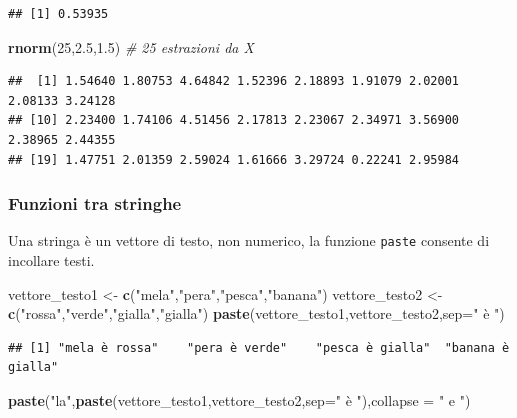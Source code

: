 \documentclass[
  11pt,
]{book}
\newenvironment{Shaded}{\begin{snugshade}}{\end{snugshade}}
\newcommand{\AttributeTok}[1]{\textcolor[rgb]{0.13,0.29,0.53}{#1}}
\newcommand{\CommentTok}[1]{\textcolor[rgb]{0.56,0.35,0.01}{\textit{#1}}}
\newcommand{\DecValTok}[1]{\textcolor[rgb]{0.00,0.00,0.81}{#1}}
\newcommand{\FloatTok}[1]{\textcolor[rgb]{0.00,0.00,0.81}{#1}}
\newcommand{\FunctionTok}[1]{\textcolor[rgb]{0.13,0.29,0.53}{\textbf{#1}}}
\newcommand{\NormalTok}[1]{#1}
\newcommand{\OtherTok}[1]{\textcolor[rgb]{0.56,0.35,0.01}{#1}}
\newcommand{\StringTok}[1]{\textcolor[rgb]{0.31,0.60,0.02}{#1}}
\theoremstyle{mytheoremstyle}
\theoremstyle{mydefstyle}
\begin{document}
\begin{verbatim}
## [1] 0.53935
\end{verbatim}

\begin{Shaded}
\begin{Highlighting}[]
\FunctionTok{rnorm}\NormalTok{(}\DecValTok{25}\NormalTok{,}\FloatTok{2.5}\NormalTok{,}\FloatTok{1.5}\NormalTok{) }\CommentTok{\# 25 estrazioni da X}
\end{Highlighting}
\end{Shaded}

\begin{verbatim}
##  [1] 1.54640 1.80753 4.64842 1.52396 2.18893 1.91079 2.02001 2.08133 3.24128
## [10] 2.23400 1.74106 4.51456 2.17813 2.23067 2.34971 3.56900 2.38965 2.44355
## [19] 1.47751 2.01359 2.59024 1.61666 3.29724 0.22241 2.95984
\end{verbatim}

\subsubsection{Funzioni tra stringhe}\label{funzioni-tra-stringhe}

Una stringa è un vettore di testo, non numerico, la funzione \texttt{paste} consente
di incollare testi.

\begin{Shaded}
\begin{Highlighting}[]
\NormalTok{vettore\_testo1 }\OtherTok{\textless{}{-}} \FunctionTok{c}\NormalTok{(}\StringTok{"mela"}\NormalTok{,}\StringTok{"pera"}\NormalTok{,}\StringTok{"pesca"}\NormalTok{,}\StringTok{"banana"}\NormalTok{)}
\NormalTok{vettore\_testo2 }\OtherTok{\textless{}{-}} \FunctionTok{c}\NormalTok{(}\StringTok{"rossa"}\NormalTok{,}\StringTok{"verde"}\NormalTok{,}\StringTok{"gialla"}\NormalTok{,}\StringTok{"gialla"}\NormalTok{)}
\FunctionTok{paste}\NormalTok{(vettore\_testo1,vettore\_testo2,}\AttributeTok{sep=}\StringTok{" è "}\NormalTok{)}
\end{Highlighting}
\end{Shaded}

\begin{verbatim}
## [1] "mela è rossa"    "pera è verde"    "pesca è gialla"  "banana è gialla"
\end{verbatim}

\begin{Shaded}
\begin{Highlighting}[]
\FunctionTok{paste}\NormalTok{(}\StringTok{"la"}\NormalTok{,}\FunctionTok{paste}\NormalTok{(vettore\_testo1,vettore\_testo2,}\AttributeTok{sep=}\StringTok{" è "}\NormalTok{),}\AttributeTok{collapse =} \StringTok{" e "}\NormalTok{)}
\end{Highlighting}
\end{Shaded}
\end{document}
